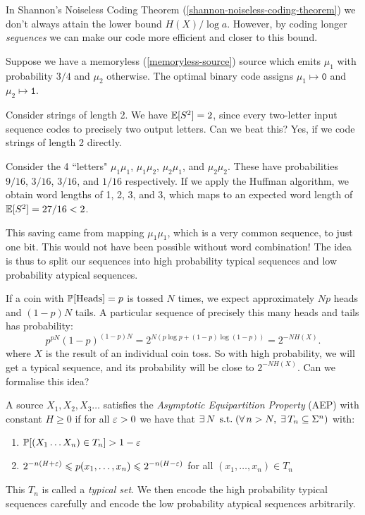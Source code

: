 \documentclass{article}
\begin{document}
In Shannon's Noiseless Coding Theorem (\ref{shannon-noiseless-coding-theorem})
we don't always attain the lower bound $H(X) / \log a$.
However, by coding longer \textit{sequences}
we can make our code more efficient and closer to this bound.

\begin{example}
    Suppose we have a memoryless (\ref{memoryless-source}) source
    which emits $\mu_1$ with probability $3/4$ and $\mu_2$ otherwise.
    The optimal binary code assigns
    $\mu_1 \mapsto \texttt{0}$ and $\mu_2 \mapsto \texttt{1}$.
    
    Consider strings of length 2.
    We have $\E[S^2] = 2$,
    since every two-letter input sequence codes to precisely two output letters.
    Can we beat this? Yes, if we code strings of length 2 directly.
    
    Consider the 4 ``letters"
    $\mu_1\mu_1$, $\mu_1\mu_2$, $\mu_2\mu_1$, and $\mu_2\mu_2$.
    These have probabilities $9/16$, $3/16$, $3/16$, and $1/16$ respectively.
    If we apply the Huffman algorithm,
    we obtain word lengths of 1, 2, 3, and 3,
    which maps to an expected word length of $\E[S^2] = 27/16 < 2$.
    
    This saving came from mapping $\mu_1 \mu_1$,
    which is a very common sequence, to just one bit.
    This would not have been possible without word combination!
    The idea is thus to split our sequences into
    high probability typical sequences and
    low probability atypical sequences.
\end{example}

If a coin with $\P[\text{Heads}] = p$ is tossed $N$ times,
we expect approximately $Np$ heads and $(1-p)N$ tails.
A particular sequence of precisely this many heads and tails has probability:
\[
p^{pN} (1-p)^{(1-p)N} =
2^{N(p \log p + (1-p)\log(1-p))} =
2^{-NH(X)}.
\]
where $X$ is the result of an individual coin toss.
So with high probability, we will get a typical sequence,
and its probability will be close to $2^{-NH(X)}$.
Can we formalise this idea?

\begin{definition}
	\label{asymptotic-equipartition-property}
    A source $X_1, X_2, X_3 \dots$ satisfies the
    \textit{Asymptotic Equipartition Property} (AEP)
    with constant $H \geq 0$
    if for all $\eps > 0$ we have that
    $\exists \, N \suchthat
    (\forall \, n > N, \; \exists \, T_n \subs \Sigma^n)$
    with:
    
	\begin{enumerate}
	    \item $\P[(X_1 \dots X_n) \in T_n] > 1-\eps$
	    \item $2^{-n(H+\eps)} \leq p(x_1, \dots , x_n) \leq 2^{-n(H-\eps)}$ for all $(x_1, \dots, x_n) \in T_n$
	\end{enumerate}
	
	This $T_n$ is called a \textit{typical set}.
	We then encode the high probability typical sequences carefully
	and encode the low probability atypical sequences arbitrarily.
\end{definition}
\end{document}
